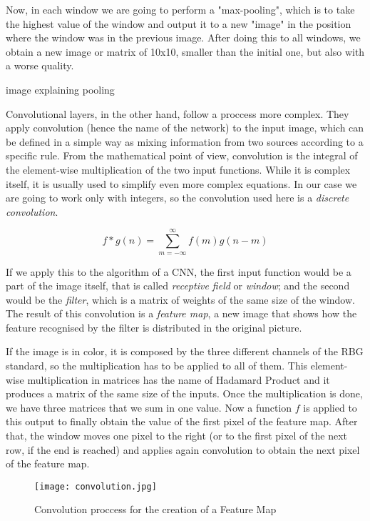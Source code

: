 Now, in each window we are going to perform a "max-pooling", which is to take the highest value of the window and output it to a new "image" in the position where the window was in the previous image. After doing this to all windows, we obtain a new image or matrix of 10x10, smaller than the initial one, but also with a worse quality.

image explaining pooling

Convolutional layers, in the other hand, follow a proccess more complex. They apply convolution (hence the name of the network) to the input image, which can be defined in a simple way as mixing information from two sources according to a specific rule. From the mathematical point of view, convolution is the integral of the element-wise multiplication of the two input functions. While it is complex itself, it is usually used to simplify even more complex equations. In our case we are going to work only with integers, so the convolution used here is a \textit{discrete convolution}. 

\begin{equation}
	\label{discrete_conv}
	f*g(n) = \sum_{m= -\infty}^{\infty} f(m) g(n-m) 
\end{equation}

If we apply this to the algorithm of a CNN, the first input function would be a part of the image itself, that is called \textit{receptive field} or \textit{window}; and the second would be the \textit{filter}, which is a matrix of weights of the same size of the window. The result of this convolution is a \textit{feature map}, a new image that shows how the feature recognised by the filter is distributed in the original picture. 

If the image is in color, it is composed by the three different channels of the RBG standard, so the multiplication has to be applied to all of them. This element-wise multiplication in matrices has the name of Hadamard Product and it produces a matrix of the same size of the inputs. Once the multiplication is done, we have three matrices that we sum in one value. Now a function $f$ is applied to this output to finally obtain the value of the first pixel of the feature map. After that, the window moves one pixel to the right (or to the first pixel of the next row, if the end is reached) and applies again convolution to obtain the next pixel of the feature map. 

\begin{figure}[ht]
	\centering
	\texttt{[image: convolution.jpg]}
	\caption{Convolution proccess for the creation of a Feature Map}
	\label{fig:convol_creation_feature_map}
\end{figure}

